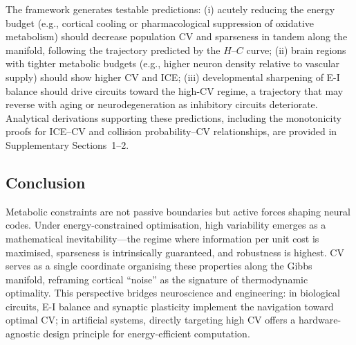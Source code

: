 The framework generates testable predictions: (i) acutely reducing the energy budget (e.g., cortical cooling or pharmacological suppression of oxidative metabolism) should decrease population CV and sparseness in tandem along the manifold, following the trajectory predicted by the $H$--$C$ curve; (ii) brain regions with tighter metabolic budgets (e.g., higher neuron density relative to vascular supply) should show higher CV and ICE; (iii) developmental sharpening of E-I balance should drive circuits toward the high-CV regime, a trajectory that may reverse with aging or neurodegeneration as inhibitory circuits deteriorate.  Analytical derivations supporting these predictions, including the monotonicity proofs for ICE--CV and collision probability--CV relationships, are provided in Supplementary Sections~1--2.

\subsection{Conclusion}

Metabolic constraints are not passive boundaries but active forces shaping neural codes.  Under energy-constrained optimisation, high variability emerges as a mathematical inevitability---the regime where information per unit cost is maximised, sparseness is intrinsically guaranteed, and robustness is highest.  CV serves as a single coordinate organising these properties along the Gibbs manifold, reframing cortical ``noise'' as the signature of thermodynamic optimality.  This perspective bridges neuroscience and engineering: in biological circuits, E-I balance and synaptic plasticity implement the navigation toward optimal CV; in artificial systems, directly targeting high CV offers a hardware-agnostic design principle for energy-efficient computation.
